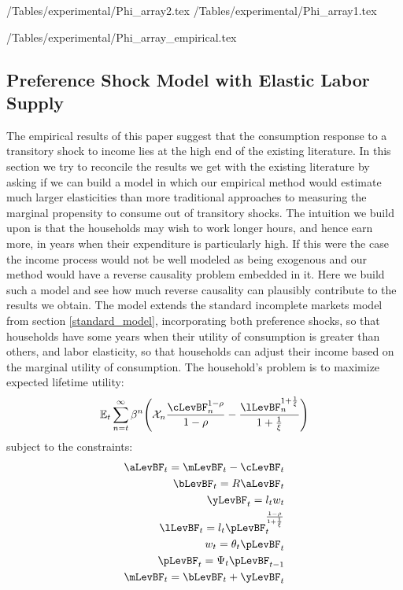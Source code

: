\begin{center}
	\econtexRoot/Tables/experimental/Phi_array2.tex	\econtexRoot/Tables/experimental/Phi_array1.tex
	\label{table:simulation_phi}
\end{center}

\begin{center}
	\econtexRoot/Tables/experimental/Phi_array_empirical.tex		
	\label{table:empirical_phi}
\end{center}

\subsection{Preference Shock Model with Elastic Labor Supply} \label{pref_shock_model}
The empirical results of this paper suggest that the consumption response to a transitory shock to income lies at the high end of the existing literature. In this section we try to reconcile the results we get with the existing literature by asking if we can build a model in which our empirical method would estimate much larger elasticities than more traditional approaches to measuring the marginal propensity to consume out of transitory shocks. The intuition we build upon is that the households may wish to work longer hours, and hence earn more, in years when their expenditure is particularly high. If this were the case the income process would not be well modeled as being exogenous and our method would have a reverse causality problem embedded in it. Here we build such a model and see how much reverse causality can plausibly contribute to the results we obtain.
The model extends the standard incomplete markets model from section \ref{standard_model}, incorporating both preference shocks, so that households have some years when their utility of consumption is greater than others, and labor elasticity, so that households can adjust their income based on the marginal utility of consumption. The household's problem is to maximize expected lifetime utility:
\begin{align*}
\mathbb{E}_t \sum_{n=t}^{\infty} \beta^n \Bigg(\mathcal{X}_n \frac{ \cLevBF_n^{1-\rho}}{1-\rho}-\frac{\lLevBF_n^{1+\frac{1}{\xi}}}{1+\frac{1}{\xi}} \Bigg)
\end{align*}
subject to the constraints:
\begin{align*}
\aLevBF_t = \mLevBF_t - \cLevBF_t \\
\bLevBF_t = R\aLevBF_t \\
\yLevBF_t =  l_t w_t \\
\lLevBF_t = l_t \pLevBF_t^{\frac{1-\rho}{1+\frac{1}{\xi}}}\\
w_t = \theta_t \pLevBF_t \\
\pLevBF_t = \Psi_t \pLevBF_{t-1} \\
\mLevBF_t = \bLevBF_t + \yLevBF_t
\end{align*}
